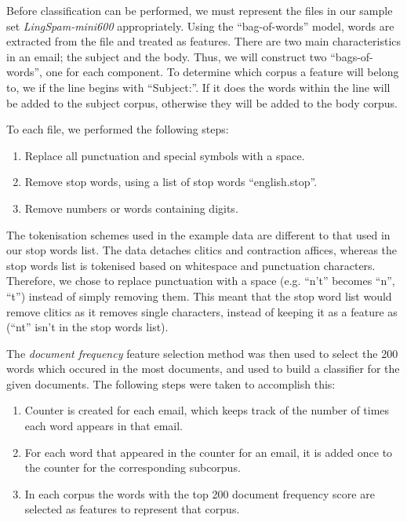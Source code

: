 \documentclass[10pt, a4paper]{article}
\begin{document}

Before classification can be performed, we must represent the files in our sample set \emph{LingSpam-mini600}\cite{lingspam} appropriately. Using the ``bag-of-words'' model, words are extracted from the file and treated as features. There are two main characteristics in an email; the subject and the body. Thus, we will construct two ``bags-of-words'', one for each component. To determine which corpus a feature will belong to, we if the line begins with ``Subject:''. If it does the words within the line will be added to the subject corpus, otherwise they will be added to the body corpus.

To each file, we performed the following steps:

\begin{enumerate}
	\item Replace all punctuation and special symbols with a space.
	\item Remove stop words, using a list of stop words ``english.stop''.
	\item Remove numbers or words containing digits.
\end{enumerate}

The tokenisation schemes used in the example data are different to that used in our stop words list. The data detaches clitics and contraction affices, whereas the stop words list is tokenised based on whitespace and punctuation characters. Therefore, we chose to replace punctuation with a space (e.g. ``n't'' becomes ``n'', ``t'') instead of simply removing them. This meant that the stop word list would remove clitics as it removes single characters, instead of keeping it as a feature as (``nt'' isn't in the stop words list).

The \emph{document frequency} feature selection method was then used to select the 200 words which occured in the most documents, and used to build a classifier for the given documents. The following steps were taken to accomplish this:

\begin{enumerate}
\item Counter is created for each email, which keeps track of the number of times each word appears in that email.
\item For each word that appeared in the counter for an email, it is added once to the counter for the corresponding subcorpus.
\item In each corpus the words with the top 200 document frequency score are selected as features to represent that corpus.
\end{enumerate}
\end{document}
